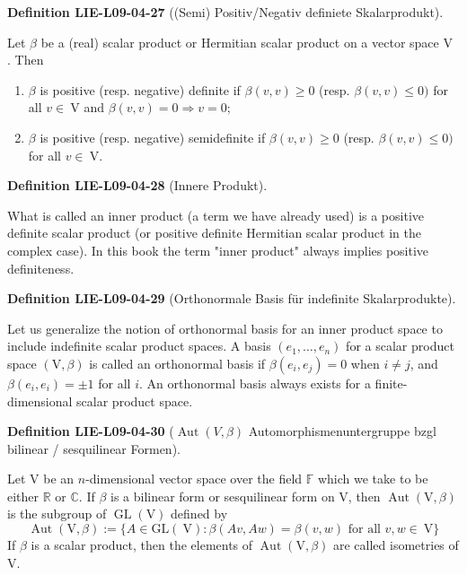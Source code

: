 \documentclass[10pt, letterpaper]{article}
\newcommand{\CustomHeading}[3]{%
  \par\medskip\noindent%
  \textbf{#1 #2} \textnormal{(#3)}.\enskip%
}
\newenvironment{DEF}[2]{\CustomHeading{Definition}{#1}{#2}}{}
\begin{document}
\begin{DEF}{LIE-L09-04-27}{(Semi) Positiv/Negativ definiete Skalarprodukt}
Let $\beta$ be a (real) scalar product or Hermitian scalar product on a vector space V . Then
\begin{enumerate}
\item $\beta$ is positive (resp. negative) definite if $\beta(v, v) \geq 0$ (resp. $\beta(v, v) \leq 0)$ for all $v \in \mathrm{~V}$ and $\beta(v, v)=0 \Longrightarrow v=0$;

\item $\beta$ is positive (resp. negative) semidefinite if $\beta(v, v) \geq 0$ (resp. $\beta(v, v) \leq 0)$ for all $v \in \mathrm{~V}$.
\end{enumerate}
\end{DEF}

\begin{DEF}{LIE-L09-04-28}{Innere Produkt}
What is called an inner product (a term we have already used) is a positive definite scalar product (or positive definite Hermitian scalar product in the complex case). In this book the term "inner product" always implies positive definiteness.
\end{DEF}

\begin{DEF}{LIE-L09-04-29}{Orthonormale Basis für indefinite Skalarprodukte}
Let us generalize the notion of orthonormal basis for an inner product space to include indefinite scalar product spaces. A basis $\left(e_{1}, \ldots, e_{n}\right)$ for a scalar product space $(\mathrm{V}, \beta)$ is called an orthonormal basis if $\beta\left(e_{i}, e_{j}\right)=0$ when $i \neq j$, and $\beta\left(e_{i}, e_{i}\right)= \pm 1$ for all $i$. An orthonormal basis always exists for a finite-dimensional scalar product space.
\end{DEF}

\begin{DEF}{LIE-L09-04-30}{$\operatorname{Aut}(V,\beta)$ Automorphismenuntergruppe bzgl bilinear / sesquilinear Formen}
Let V be an $n$-dimensional vector space over the field $\mathbb{F}$ which we take to be either $\mathbb{R}$ or $\mathbb{C}$. If $\beta$ is a bilinear form or sesquilinear form on V, then $\operatorname{Aut}(\mathrm{V}, \beta)$ is the subgroup of $\operatorname{GL}(\mathrm{V})$ defined by
$$
\operatorname{Aut}(\mathrm{V}, \beta):=\{A \in \mathrm{GL}(\mathrm{~V}): \beta(A v, A w)=\beta(v, w) \text { for all } v, w \in \mathrm{~V}\}
$$
If $\beta$ is a scalar product, then the elements of $\operatorname{Aut}(\mathrm{V}, \beta)$ are called isometries of V.
\end{DEF}
\end{document}
